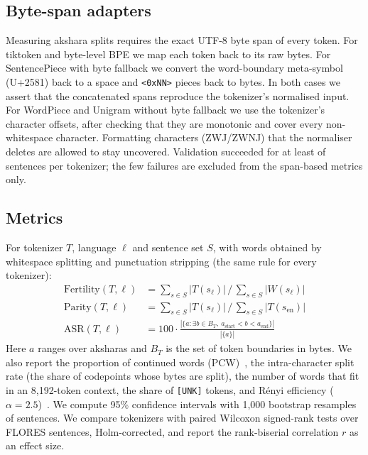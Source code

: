 \documentclass[conference]{IEEEtran}
\begin{document}
\subsection{Byte-span adapters}
Measuring akshara splits requires the exact UTF-8 byte span of every token. For tiktoken and byte-level BPE we map each token back to its raw bytes. For SentencePiece with byte fallback we convert the word-boundary meta-symbol (U+2581) back to a space and \texttt{<0xNN>} pieces back to bytes. In both cases we assert that the concatenated spans reproduce the tokenizer's normalised input. For WordPiece and Unigram without byte fallback we use the tokenizer's character offsets, after checking that they are monotonic and cover every non-whitespace character. Formatting characters (ZWJ/ZWNJ) that the normaliser deletes are allowed to stay uncovered. Validation succeeded for at least  of  sentences per tokenizer; the few failures are excluded from the span-based metrics only.

\subsection{Metrics}
For tokenizer $T$, language $\ell$ and sentence set $S$, with words obtained by whitespace splitting and punctuation stripping (the same rule for every tokenizer):
\begin{align}
\text{Fertility}(T,\ell) &= \textstyle\sum_{s\in S} |T(s_\ell)| \,/\, \sum_{s\in S} |W(s_\ell)|\\
\text{Parity}(T,\ell) &= \textstyle\sum_{s\in S} |T(s_\ell)| \,/\, \sum_{s\in S} |T(s_{\text{en}})|\\
\text{ASR}(T,\ell) &= 100\cdot \frac{|\{a : \exists b\in B_T,\ a_{\text{start}}<b<a_{\text{end}}\}|}{|\{a\}|}
\end{align}
Here $a$ ranges over aksharas and $B_T$ is the set of token boundaries in bytes. We also report the proportion of continued words (PCW)~\cite{rust-etal-2021-good}, the intra-character split rate (the share of codepoints whose bytes are split), the number of words that fit in an 8,192-token context, the share of \texttt{[UNK]} tokens, and Rényi efficiency ($\alpha{=}2.5$)~\cite{zouhar-etal-2023-tokenization}. We compute 95\% confidence intervals with 1,000 bootstrap resamples of sentences. We compare tokenizers with paired Wilcoxon signed-rank tests over FLORES sentences, Holm-corrected, and report the rank-biserial correlation $r$ as an effect size.
\end{document}
